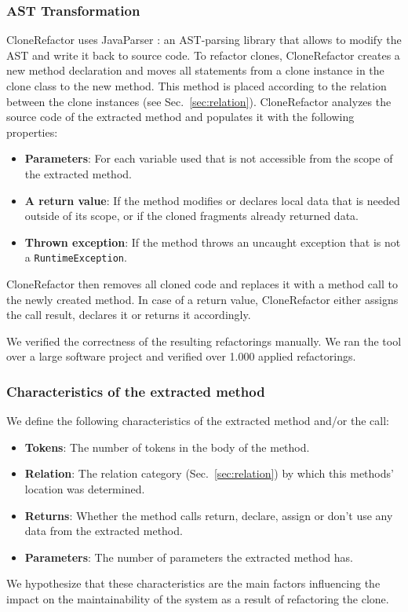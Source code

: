 \documentclass[sigconf,review, table]{acmart}
\begin{document}
\subsubsection{AST Transformation}
CloneRefactor uses JavaParser \cite{tomassetti2017javaparser}: an AST-parsing library that allows to modify the AST and write it back to source code. To refactor clones, CloneRefactor creates a new method declaration and moves all statements from a clone instance in the clone class to the new method. This method is placed according to the relation between the clone instances (see Sec.~\ref{sec:relation}). CloneRefactor analyzes the source code of the extracted method and populates it with the following properties:
\begin{itemize}
  \item \textbf{Parameters}: For each variable used that is not accessible from the scope of the extracted method.
  \item \textbf{A return value}: If the method modifies or declares local data that is needed outside of its scope, or if the cloned fragments already returned data.
  \item \textbf{Thrown exception}: If the method throws an uncaught exception that is not a \texttt{RuntimeException}.
\end{itemize}
CloneRefactor then removes all cloned code and replaces it with a method call to the newly created method. In case of a return value, CloneRefactor either assigns the call result, declares it or returns it accordingly.

We verified the correctness of the resulting refactorings manually. We ran the tool over a large software project and verified over 1.000 applied refactorings.

\subsubsection{Characteristics of the extracted method}\label{sec:characteristics}
We define the following characteristics of the extracted method and/or the call:
\begin{itemize}
\item \textbf{Tokens}: The number of tokens in the body of the method.
\item \textbf{Relation}: The relation category (Sec.~\ref{sec:relation}) by which this methods' location was determined.
\item \textbf{Returns}: Whether the method calls return, declare, assign or don't use any data from the extracted method.
\item \textbf{Parameters}: The number of parameters the extracted method has.
\end{itemize}
We hypothesize that these characteristics are the main factors influencing the impact on the maintainability of the system as a result of refactoring the clone.
\end{document}
